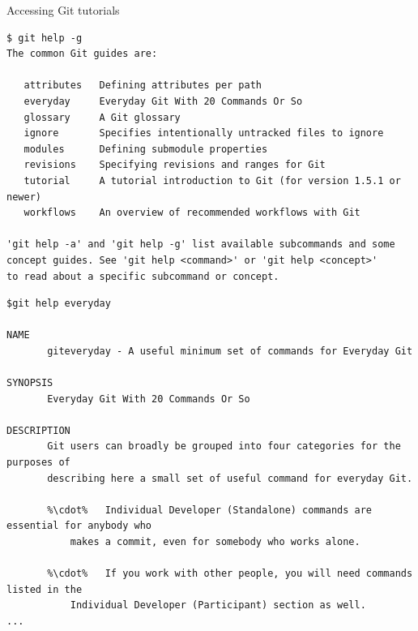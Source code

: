 \documentclass[svgnames]{beamer}
\begin{document}
\begin{frame}[fragile]{Accessing Git tutorials}
 \begin{lstlisting}[basicstyle={\ttfamily\tiny}]
$ git help -g
The common Git guides are:

   attributes   Defining attributes per path
   everyday     Everyday Git With 20 Commands Or So
   glossary     A Git glossary
   ignore       Specifies intentionally untracked files to ignore
   modules      Defining submodule properties
   revisions    Specifying revisions and ranges for Git
   tutorial     A tutorial introduction to Git (for version 1.5.1 or newer)
   workflows    An overview of recommended workflows with Git

'git help -a' and 'git help -g' list available subcommands and some
concept guides. See 'git help <command>' or 'git help <concept>'
to read about a specific subcommand or concept.
 \end{lstlisting}
 \begin{lstlisting}[basicstyle={\ttfamily\tiny}, escapechar=\%]
$git help everyday

NAME
       giteveryday - A useful minimum set of commands for Everyday Git

SYNOPSIS
       Everyday Git With 20 Commands Or So

DESCRIPTION
       Git users can broadly be grouped into four categories for the purposes of
       describing here a small set of useful command for everyday Git.

       %\cdot%   Individual Developer (Standalone) commands are essential for anybody who
           makes a commit, even for somebody who works alone.

       %\cdot%   If you work with other people, you will need commands listed in the
           Individual Developer (Participant) section as well.
...
 \end{lstlisting}
\end{frame}
\end{document}
